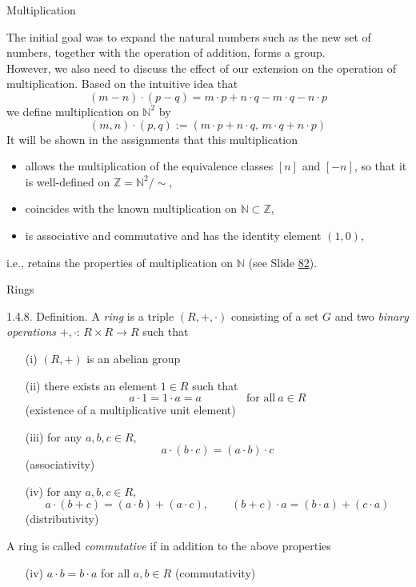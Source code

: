\documentclass[smaller,hyperref={CJKbookmarks=true}]{beamer}
\newcommand{\N}{\mathbb{N}} \newcommand{\Z}{\mathbb{Z}} \newcommand{\Q}{\mathbb{Q}}
\begin{document}
\begin{frame}[t]{Multiplication}
\begin{spacing}{0.95}
The initial goal was to expand the natural numbers such as the new set of
numbers, together with the operation of addition, forms a group.\\[5pt]
However, we also need to discuss the effect of our extension on the
operation of multiplication. Based on the intuitive idea that
\[(m-n)\cdot(p-q)=m\cdot p+n\cdot q-m\cdot q-n\cdot p\]
we define multiplication on $\N^2$ by
\[(m,n)\cdot(p,q):=(m\cdot p+n\cdot q,\,m\cdot q+n\cdot p)\]
It will be shown in the assignments that this multiplication
\begin{itemize}
  \item allows the multiplication of the equivalence classes $[n]$ and $[-n]$, so that it is well-defined on $\Z=\N^2/\sim$,
  \item coincides with the known multiplication on $\N\subset\Z$,
  \item is associative and commutative and has the identity element $(1,0)$,
\end{itemize}
i.e., retains the properties of multiplication on $\N$ (see Slide \hyperlink{82}{82}).
\end{spacing}
\end{frame}
\begin{frame}[t,shrink,label=1.4.8]{Rings}
\begin{spacing}{0.9}
\alert{1.4.8. Definition.} A \emph{ring} is a triple $(R,+,\cdot)$ consisting of a set $G$ and two \emph{binary operations} $+,\cdot:\,R\times R\to R$ such that
\begin{itemize}
  \item[(i)] $(R,+)$ is an abelian group
  \item[(ii)] there exists an element $1\in R$ such that
      \[a\cdot1=1\cdot a=a\qquad\qquad\text{for all}~a\in R\]
      \alert{(existence of a multiplicative unit element)}
  \item[(iii)] for any $a,b,c\in R$,
      \[a\cdot(b\cdot c)=(a\cdot b)\cdot c\]
      \alert{(associativity)}
  \item[(iv)] for any $a,b,c\in R$,
      \[a\cdot(b+c)=(a\cdot b)+(a\cdot c),\qquad
      (b+c)\cdot a=(b\cdot a)+(c\cdot a)\]
      \alert{(distributivity)}
\end{itemize}
A ring is called \emph{commutative} if in addition to the above properties
\begin{itemize}
  \item[(iv)] $a\cdot b=b\cdot a$ for all $a,b\in R$ \alert{(commutativity)}
\end{itemize}
\end{spacing}
\end{frame}
\end{document}
